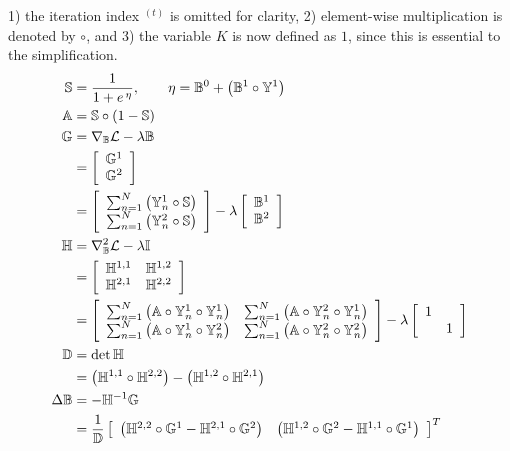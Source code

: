 1) the iteration index ${}^{(t)}$ is omitted for clarity,
2) element-wise multiplication is denoted by $\circ$, and
3) the variable $K$ is now defined as $1$, since this is essential to the simplification.
\begin{align}
\mathbb{S} &= \frac{1}{1+e^{\thinspace\eta}},\qquad \eta = \mathbb{B}^0 + \left(\mathbb{B}^1\circ\mathbb{Y}^1\right)\\
\mathbb{A} &= \mathbb{S}\circ\left(1-\mathbb{S}\right)\\
\mathbb{G} &= \nabla_{\mathbb{B}}\mathcal{L} - \lambda\mathbb{B} \nonumber \\
&= \left[\begin{array}{c}
\mathbb{G}^1 \\ \mathbb{G}^2
\end{array}\right] \nonumber \\
&= \left[\begin{array}{c}
\sum_{n=1}^{N}\left( \mathbb{Y}_n^1\circ\mathbb{S} \right) \\
\sum_{n=1}^{N}\left( \mathbb{Y}_n^2\circ\mathbb{S} \right)
\end{array}\right] - \lambda\left[\begin{array}{c} \mathbb{B}^1 \\ \mathbb{B}^2\end{array}\right]\\
\mathbb{H} &= \nabla_{\mathbb{B}}^2\mathcal{L} -\lambda\mathbb{I} \nonumber \\
&= \left[\begin{array}{cc}
\mathbb{H}^{1,1} & \mathbb{H}^{1,2} \\ \mathbb{H}^{2,1} & \mathbb{H}^{2,2}
\end{array}\right] \nonumber \\
&= \left[\begin{array}{cc}
\sum_{n=1}^{N}\left( \mathbb{A}\circ\mathbb{Y}_n^1\circ\mathbb{Y}_n^1 \right) & 
\sum_{n=1}^{N}\left( \mathbb{A}\circ\mathbb{Y}_n^2\circ\mathbb{Y}_n^1 \right) \\
\sum_{n=1}^{N}\left( \mathbb{A}\circ\mathbb{Y}_n^1\circ\mathbb{Y}_n^2 \right) & 
\sum_{n=1}^{N}\left( \mathbb{A}\circ\mathbb{Y}_n^2\circ\mathbb{Y}_n^2 \right)
\end{array}\right] - \lambda\left[\begin{array}{cc} 1 & \\ & 1\end{array}\right]\\
\mathbb{D} &= \det{\mathbb{H}} \nonumber \\
&= \left(\mathbb{H}^{1,1}\circ\mathbb{H}^{2,2}\right) - \left(\mathbb{H}^{1,2}\circ\mathbb{H}^{2,1}\right) \\
\Delta\mathbb{B} &= -\mathbb{H}^{-1}\mathbb{G} \nonumber \\
&= \dfrac{1}{\mathbb{D}} \left[\begin{array}{cc}
\left(\mathbb{H}^{2,2}\circ\mathbb{G}^{1} - \mathbb{H}^{2,1}\circ\mathbb{G}^{2} \right) & 
\left(\mathbb{H}^{1,2}\circ\mathbb{G}^{2} - \mathbb{H}^{1,1}\circ\mathbb{G}^{1} \right)
\end{array}\right]^{T}
\end{align}
